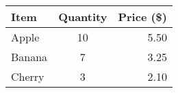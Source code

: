 \newenvironment{simpleTable}{
  \begingroup
  \begin{center}
  \renewcommand{\arraystretch}{1.2}
}{
  \end{center}
  \endgroup
}

\begin{simpleTable}
\begin{tabular}{|l|c|r|}
\hline
Item & Quantity & Price (\$) \\
\hline
Apple & 10 & 5.50 \\
Banana & 7 & 3.25 \\
Cherry & 3 & 2.10 \\
\hline
\end{tabular}
\end{simpleTable}
